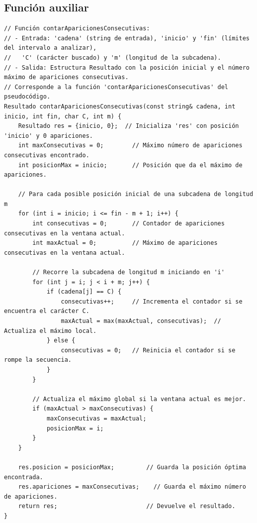 \documentclass[12pt,a4paper]{article}
\begin{document}
\subsection{Función auxiliar}
\begin{lstlisting}[caption=Función contarAparicionesConsecutivas]
// Función contarAparicionesConsecutivas:
// - Entrada: 'cadena' (string de entrada), 'inicio' y 'fin' (límites del intervalo a analizar),
//   'C' (carácter buscado) y 'm' (longitud de la subcadena).
// - Salida: Estructura Resultado con la posición inicial y el número máximo de apariciones consecutivas.
// Corresponde a la función 'contarAparicionesConsecutivas' del pseudocódigo.
Resultado contarAparicionesConsecutivas(const string& cadena, int inicio, int fin, char C, int m) {
    Resultado res = {inicio, 0};  // Inicializa 'res' con posición 'inicio' y 0 apariciones.
    int maxConsecutivas = 0;        // Máximo número de apariciones consecutivas encontrado.
    int posicionMax = inicio;       // Posición que da el máximo de apariciones.
    
    // Para cada posible posición inicial de una subcadena de longitud m
    for (int i = inicio; i <= fin - m + 1; i++) {
        int consecutivas = 0;       // Contador de apariciones consecutivas en la ventana actual.
        int maxActual = 0;          // Máximo de apariciones consecutivas en la ventana actual.
        
        // Recorre la subcadena de longitud m iniciando en 'i'
        for (int j = i; j < i + m; j++) {
            if (cadena[j] == C) {
                consecutivas++;     // Incrementa el contador si se encuentra el carácter C.
                maxActual = max(maxActual, consecutivas);  // Actualiza el máximo local.
            } else {
                consecutivas = 0;   // Reinicia el contador si se rompe la secuencia.
            }
        }
        
        // Actualiza el máximo global si la ventana actual es mejor.
        if (maxActual > maxConsecutivas) {
            maxConsecutivas = maxActual;
            posicionMax = i;
        }
    }
    
    res.posicion = posicionMax;         // Guarda la posición óptima encontrada.
    res.apariciones = maxConsecutivas;    // Guarda el máximo número de apariciones.
    return res;                         // Devuelve el resultado.
}
\end{lstlisting}
\end{document}
